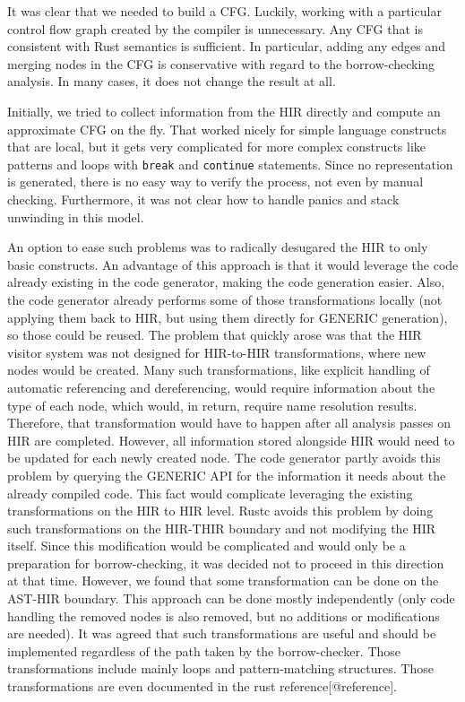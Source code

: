 \documentclass[
  11pt,
]{report}
\begin{document}
It was clear that we needed to build a CFG. Luckily, working with a
particular control flow graph created by the compiler is unnecessary.
Any CFG that is consistent with Rust semantics is sufficient. In
particular, adding any edges and merging nodes in the CFG is
conservative with regard to the borrow-checking analysis. In many cases,
it does not change the result at all.

Initially, we tried to collect information from the HIR directly and
compute an approximate CFG on the fly. That worked nicely for simple
language constructs that are local, but it gets very complicated for
more complex constructs like patterns and loops with \texttt{break} and
\texttt{continue} statements. Since no representation is generated,
there is no easy way to verify the process, not even by manual checking.
Furthermore, it was not clear how to handle panics and stack unwinding
in this model.

An option to ease such problems was to radically desugared the HIR to
only basic constructs. An advantage of this approach is that it would
leverage the code already existing in the code generator, making the
code generation easier. Also, the code generator already performs some
of those transformations locally (not applying them back to HIR, but
using them directly for GENERIC generation), so those could be reused.
The problem that quickly arose was that the HIR visitor system was not
designed for HIR-to-HIR transformations, where new nodes would be
created. Many such transformations, like explicit handling of automatic
referencing and dereferencing, would require information about the type
of each node, which would, in return, require name resolution results.
Therefore, that transformation would have to happen after all analysis
passes on HIR are completed. However, all information stored alongside
HIR would need to be updated for each newly created node. The code
generator partly avoids this problem by querying the GENERIC API for the
information it needs about the already compiled code. This fact would
complicate leveraging the existing transformations on the HIR to HIR
level. Rustc avoids this problem by doing such transformations on the
HIR-THIR boundary and not modifying the HIR itself. Since this
modification would be complicated and would only be a preparation for
borrow-checking, it was decided not to proceed in this direction at that
time. However, we found that some transformation can be done on the
AST-HIR boundary. This approach can be done mostly independently (only
code handling the removed nodes is also removed, but no additions or
modifications are needed). It was agreed that such transformations are
useful and should be implemented regardless of the path taken by the
borrow-checker. Those transformations include mainly loops and
pattern-matching structures. Those transformations are even documented
in the rust reference{[}@reference{]}.
\end{document}
